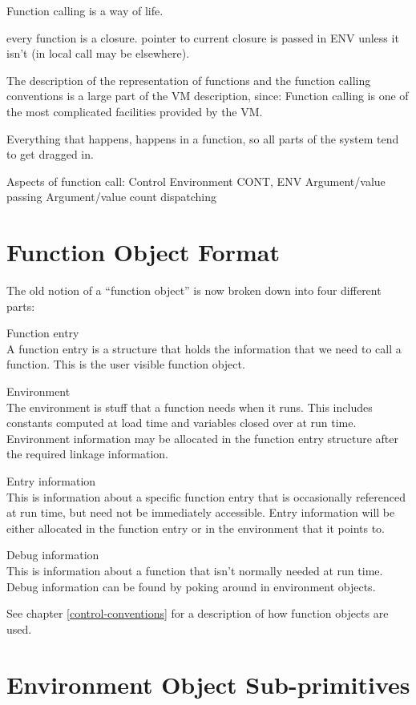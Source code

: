 {\begin{itemize, spread 0, spacing 1}
Function calling is a way of life.  

every function is a closure.  pointer to current closure is passed in ENV
unless it isn't (in local call may be elsewhere).

The description of the representation of functions and the function calling
conventions is a large part of the VM description, since:
    Function calling is one of the most complicated facilities provided by the
    VM.

    Everything that happens, happens in a function, so all parts of the system
    tend to get dragged in.


Aspects of function call:
    Control
    Environment CONT, ENV
    Argument/value passing
    Argument/value count dispatching



\section{Function Object Format}
\label{Fn-Format}

The old notion of a ``function object'' is now broken down into four different
parts:
\begin{description}
Function entry\\A function entry is a structure that holds the information
that we need to call a function.  This is the user visible function object.

Environment\\The environment is stuff that a function needs when it runs.
This includes constants computed at load time and variables closed over at run
time.  Environment information may be allocated in the function entry structure
after the required linkage information.

Entry information\\This is information about a specific function entry that is
occasionally referenced at run time, but need not be immediately accessible.
Entry information will be either allocated in the function entry
or in the environment that it points to.

Debug information\\This is information about a function that isn't normally
needed at run time.  Debug information can be found by poking around in
environment objects.
\end{description}
See chapter \ref{control-conventions} for a description of how function objects
are used.

\section{Environment Object Sub-primitives}


\end{itemize, spread 0, spacing 1}}
